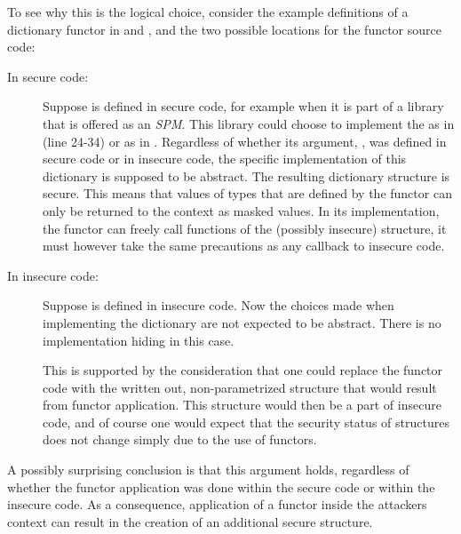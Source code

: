 To see why this is the logical choice, consider the example definitions of a dictionary functor in  and , and the two possible locations for the functor source code:
\begin{description}
\item[In secure code:] 
Suppose  is defined in secure code, for example when it is part of a library that is offered as an \emph{SPM}.
This library could choose to implement the  as in  (line 24-34) or as in .
Regardless of whether its argument, , was defined in secure code or in insecure code, the specific implementation of this dictionary is supposed to be abstract.
The resulting dictionary structure is secure.
This means that values of types that are defined by the functor can only be returned to the context as masked values.
In its implementation, the functor can freely call functions of the (possibly insecure) structure, it must however take the same precautions as any callback to insecure code.
\item[In insecure code:] Suppose  is defined in insecure code.
Now the choices made when implementing the dictionary are not expected to be abstract. There is no implementation hiding in this case.

This is supported by the consideration that one could replace the functor code with the written out, non-parametrized structure that would result from functor application.
This structure would then be a part of insecure code, and of course one would expect that the security status of structures does not change simply due to the use of functors.
\end{description}

A possibly surprising conclusion is that this argument holds, regardless of whether the functor application was done within the secure code or within the insecure code.
As a consequence, application of a functor inside the attackers context can result in the creation of an additional secure structure.

